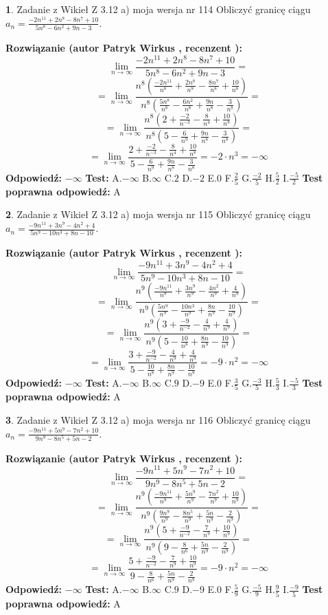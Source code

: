 \documentclass[12pt, a4paper]{article}
\theoremstyle{definition} %
\newtheorem{zad}{}
\newcommand{\zadStart}[1]{\begin{zad}#1\newline}
\newcommand{\zadStop}{\end{zad}}
\newcommand{\rozwStart}[2]{\noindent \textbf{Rozwiązanie (autor #1 , recenzent #2): }\newline}
\newcommand{\rozwStop}{\newline}
\newcommand{\odpStart}{\noindent \textbf{Odpowiedź:}\newline}
\newcommand{\odpStop}{\newline}
\newcommand{\testStart}{\noindent \textbf{Test:}\newline}
\newcommand{\testStop}{\newline}
\newcommand{\kluczStart}{\noindent \textbf{Test poprawna odpowiedź:}\newline}
\newcommand{\kluczStop}{\newline}
\begin{document}
\zadStart{Zadanie z Wikieł Z 3.12 a) moja wersja nr 114}
Obliczyć granicę ciągu $a_{n}=\frac{-2n^{11}+2n^{8}-8n^{7}+10}{5n^{8}-6n^{2}+9n-3}$.
\zadStop
\rozwStart{Patryk Wirkus}{}
$$\lim\limits_{n\to\infty}\frac{-2n^{11}+2n^{8}-8n^{7}+10}{5n^{8}-6n^{2}+9n-3}=$$
$$=\lim\limits_{n\to\infty}\frac{n^{8}\left(\frac{-2n^{11}}{n^{8}}+\frac{2n^{8}}{n^{8}}-\frac{8n^{7}}{n^{8}}+\frac{10}{n^{8}}\right)}{n^{8}\left(\frac{5n^{8}}{n^{8}}-\frac{6n^{2}}{n^{8}}+\frac{9n}{n^{8}}-\frac{3}{n^{8}}\right)}=$$
$$=\lim\limits_{n\to\infty}\frac{n^{8}\left(2+\frac{-2}{n^{-3}}-\frac{8}{n^{4}}+\frac{10}{n^{8}}\right)}
{n^{8}\left(5-\frac{6}{n^{9}}+\frac{9n}{n^{8}}-\frac{3}{n^{8}}\right)}=$$
$$=\lim\limits_{n\to\infty}\frac{2+\frac{-2}{n^{-3}}-\frac{8}{n^{4}}+\frac{10}{n^{8}}}{5-\frac{6}{n^{9}}+\frac{9n}{n^{8}}-\frac{3}{n^{8}}}=-2\cdot n^{3} = -\infty$$
\rozwStop
\odpStart
$-\infty$
\odpStop
\testStart
A.$-\infty$
B.$\infty$
C.$2$
D.$-2$
E.$0$
F.$\frac{2}{5}$
G.$\frac{-2}{5}$
H.$\frac{5}{2}$
I.$\frac{-5}{2}$
\testStop
\kluczStart
A
\kluczStop



\zadStart{Zadanie z Wikieł Z 3.12 a) moja wersja nr 115}
Obliczyć granicę ciągu $a_{n}=\frac{-9n^{11}+3n^{9}-4n^{2}+4}{5n^{9}-10n^{3}+8n-10}$.
\zadStop
\rozwStart{Patryk Wirkus}{}
$$\lim\limits_{n\to\infty}\frac{-9n^{11}+3n^{9}-4n^{2}+4}{5n^{9}-10n^{3}+8n-10}=$$
$$=\lim\limits_{n\to\infty}\frac{n^{9}\left(\frac{-9n^{11}}{n^{9}}+\frac{3n^{9}}{n^{9}}-\frac{4n^{2}}{n^{9}}+\frac{4}{n^{9}}\right)}{n^{9}\left(\frac{5n^{9}}{n^{9}}-\frac{10n^{3}}{n^{9}}+\frac{8n}{n^{9}}-\frac{10}{n^{9}}\right)}=$$
$$=\lim\limits_{n\to\infty}\frac{n^{9}\left(3+\frac{-9}{n^{-2}}-\frac{4}{n^{9}}+\frac{4}{n^{9}}\right)}
{n^{9}\left(5-\frac{10}{n^{8}}+\frac{8n}{n^{9}}-\frac{10}{n^{9}}\right)}=$$
$$=\lim\limits_{n\to\infty}\frac{3+\frac{-9}{n^{-2}}-\frac{4}{n^{9}}+\frac{4}{n^{9}}}{5-\frac{10}{n^{8}}+\frac{8n}{n^{9}}-\frac{10}{n^{9}}}=-9\cdot n^{2} = -\infty$$
\rozwStop
\odpStart
$-\infty$
\odpStop
\testStart
A.$-\infty$
B.$\infty$
C.$9$
D.$-9$
E.$0$
F.$\frac{3}{5}$
G.$\frac{-3}{5}$
H.$\frac{5}{3}$
I.$\frac{-5}{3}$
\testStop
\kluczStart
A
\kluczStop



\zadStart{Zadanie z Wikieł Z 3.12 a) moja wersja nr 116}
Obliczyć granicę ciągu $a_{n}=\frac{-9n^{11}+5n^{9}-7n^{2}+10}{9n^{9}-8n^{5}+5n-2}$.
\zadStop
\rozwStart{Patryk Wirkus}{}
$$\lim\limits_{n\to\infty}\frac{-9n^{11}+5n^{9}-7n^{2}+10}{9n^{9}-8n^{5}+5n-2}=$$
$$=\lim\limits_{n\to\infty}\frac{n^{9}\left(\frac{-9n^{11}}{n^{9}}+\frac{5n^{9}}{n^{9}}-\frac{7n^{2}}{n^{9}}+\frac{10}{n^{9}}\right)}{n^{9}\left(\frac{9n^{9}}{n^{9}}-\frac{8n^{5}}{n^{9}}+\frac{5n}{n^{9}}-\frac{2}{n^{9}}\right)}=$$
$$=\lim\limits_{n\to\infty}\frac{n^{9}\left(5+\frac{-9}{n^{-2}}-\frac{7}{n^{9}}+\frac{10}{n^{9}}\right)}
{n^{9}\left(9-\frac{8}{n^{6}}+\frac{5n}{n^{9}}-\frac{2}{n^{9}}\right)}=$$
$$=\lim\limits_{n\to\infty}\frac{5+\frac{-9}{n^{-2}}-\frac{7}{n^{9}}+\frac{10}{n^{9}}}{9-\frac{8}{n^{6}}+\frac{5n}{n^{9}}-\frac{2}{n^{9}}}=-9\cdot n^{2} = -\infty$$
\rozwStop
\odpStart
$-\infty$
\odpStop
\testStart
A.$-\infty$
B.$\infty$
C.$9$
D.$-9$
E.$0$
F.$\frac{5}{9}$
G.$\frac{-5}{9}$
H.$\frac{9}{5}$
I.$\frac{-9}{5}$
\testStop
\kluczStart
A
\kluczStop
\end{document}
